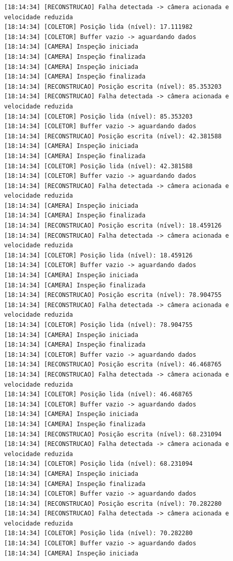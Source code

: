 \documentclass[12pt]{article}
\begin{document}
\begin{verbatim}
[18:14:34] [RECONSTRUCAO] Falha detectada -> câmera acionada e velocidade reduzida
[18:14:34] [COLETOR] Posição lida (nível): 17.111982
[18:14:34] [COLETOR] Buffer vazio -> aguardando dados
[18:14:34] [CAMERA] Inspeção iniciada
[18:14:34] [CAMERA] Inspeção finalizada
[18:14:34] [CAMERA] Inspeção iniciada
[18:14:34] [CAMERA] Inspeção finalizada
[18:14:34] [RECONSTRUCAO] Posição escrita (nível): 85.353203
[18:14:34] [RECONSTRUCAO] Falha detectada -> câmera acionada e velocidade reduzida
[18:14:34] [COLETOR] Posição lida (nível): 85.353203
[18:14:34] [COLETOR] Buffer vazio -> aguardando dados
[18:14:34] [RECONSTRUCAO] Posição escrita (nível): 42.381588
[18:14:34] [CAMERA] Inspeção iniciada
[18:14:34] [CAMERA] Inspeção finalizada
[18:14:34] [COLETOR] Posição lida (nível): 42.381588
[18:14:34] [COLETOR] Buffer vazio -> aguardando dados
[18:14:34] [RECONSTRUCAO] Falha detectada -> câmera acionada e velocidade reduzida
[18:14:34] [CAMERA] Inspeção iniciada
[18:14:34] [CAMERA] Inspeção finalizada
[18:14:34] [RECONSTRUCAO] Posição escrita (nível): 18.459126
[18:14:34] [RECONSTRUCAO] Falha detectada -> câmera acionada e velocidade reduzida
[18:14:34] [COLETOR] Posição lida (nível): 18.459126
[18:14:34] [COLETOR] Buffer vazio -> aguardando dados
[18:14:34] [CAMERA] Inspeção iniciada
[18:14:34] [CAMERA] Inspeção finalizada
[18:14:34] [RECONSTRUCAO] Posição escrita (nível): 78.904755
[18:14:34] [RECONSTRUCAO] Falha detectada -> câmera acionada e velocidade reduzida
[18:14:34] [COLETOR] Posição lida (nível): 78.904755
[18:14:34] [CAMERA] Inspeção iniciada
[18:14:34] [CAMERA] Inspeção finalizada
[18:14:34] [COLETOR] Buffer vazio -> aguardando dados
[18:14:34] [RECONSTRUCAO] Posição escrita (nível): 46.468765
[18:14:34] [RECONSTRUCAO] Falha detectada -> câmera acionada e velocidade reduzida
[18:14:34] [COLETOR] Posição lida (nível): 46.468765
[18:14:34] [COLETOR] Buffer vazio -> aguardando dados
[18:14:34] [CAMERA] Inspeção iniciada
[18:14:34] [CAMERA] Inspeção finalizada
[18:14:34] [RECONSTRUCAO] Posição escrita (nível): 68.231094
[18:14:34] [RECONSTRUCAO] Falha detectada -> câmera acionada e velocidade reduzida
[18:14:34] [COLETOR] Posição lida (nível): 68.231094
[18:14:34] [CAMERA] Inspeção iniciada
[18:14:34] [CAMERA] Inspeção finalizada
[18:14:34] [COLETOR] Buffer vazio -> aguardando dados
[18:14:34] [RECONSTRUCAO] Posição escrita (nível): 70.282280
[18:14:34] [RECONSTRUCAO] Falha detectada -> câmera acionada e velocidade reduzida
[18:14:34] [COLETOR] Posição lida (nível): 70.282280
[18:14:34] [COLETOR] Buffer vazio -> aguardando dados
[18:14:34] [CAMERA] Inspeção iniciada

\end{verbatim}
\end{document}
